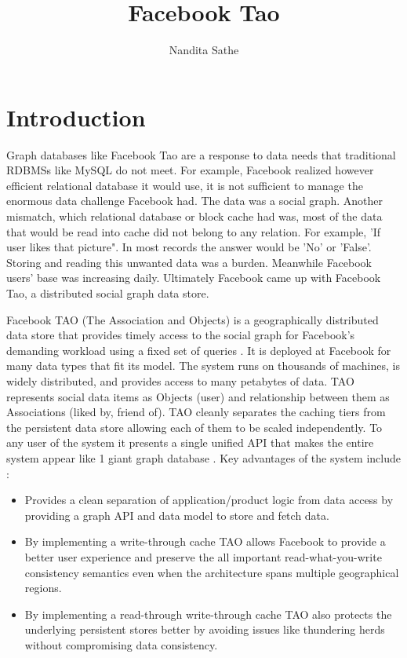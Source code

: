 \documentclass[9pt,twocolumn,twoside]{../../styles/osajnl}
\title{Facebook Tao}
\author[1,*]{Nandita Sathe}
\affil[1]{School of Informatics and Computing, Bloomington, IN 47408, U.S.A.}
\affil[*]{Corresponding author: nsathe@iu.edu}
\begin{document}
\maketitle

\section{Introduction}

Graph databases like Facebook Tao are a response to data needs that traditional RDBMSs like MySQL do not meet. For example, Facebook realized however efficient relational database it would use, it is not sufficient to manage the enormous data challenge Facebook had. The data was a social graph. Another mismatch, which relational database or block cache had was, most of the data that would be read into cache did not belong to any relation. For example, 'If user likes that picture". In most records the answer would be 'No' or 'False'. Storing and reading this unwanted data was a burden. Meanwhile Facebook users' base was increasing daily. Ultimately Facebook came up with Facebook Tao, a distributed social graph data store.

Facebook TAO (The Association and Objects) is a geographically distributed data store that provides timely access to the social graph for Facebook’s demanding workload using a fixed set of queries \cite{book-tao1}. It is deployed at Facebook for many data types that fit its model. The system runs on thousands of machines, is widely distributed, and provides access to many petabytes of data. TAO represents social data items as Objects (user) and relationship between them as Associations (liked by, friend of). TAO cleanly separates the caching tiers from the persistent data store allowing each of them to be scaled independently. To any user of the system it presents a single unified API that makes the entire system appear like 1 giant graph database \cite{www-tao1}.
Key advantages of the system include \cite{www-tao1}:
\begin{itemize}
\item Provides a clean separation of application/product logic from data access by providing a graph API and data model to store and fetch data.
\item By implementing a write-through cache TAO allows Facebook to provide a better user experience and preserve the all important read-what-you-write consistency semantics even when the architecture spans multiple geographical regions.
\item By implementing a read-through write-through cache TAO also protects the underlying persistent stores better by avoiding issues like thundering herds without compromising data consistency.

\end{itemize}
\end{document}
